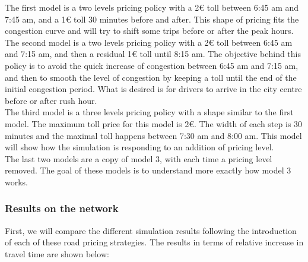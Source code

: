 \documentclass[a4paper, 12pt,oneside]{article}
\begin{document}
The first model is a two levels pricing policy with a 2€ toll between 6:45 am and 7:45 am, and a 1€ toll 30 minutes before and after. This shape of pricing fits the congestion curve and will try to shift some trips before or after the peak hours.\\

The second model is a two levels pricing policy with a 2€ toll between 6:45 am and 7:15 am, and then a residual 1€ toll until 8:15 am. The objective behind this policy is to avoid the quick increase of congestion between 6:45 am and 7:15 am, and then to smooth the level of congestion by keeping a toll until the end of the initial congestion period. What is desired is for drivers to arrive in the city centre before or after rush hour.\\

The third model is a three levels pricing policy with a shape similar to the first model. The maximum toll price for this model is 2€. The width of each step is 30 minutes and the maximal toll happens between 7:30 am and 8:00 am. This model will show how the simulation is responding to an addition of pricing level.\\

The last two models are a copy of model 3, with each time a pricing level removed. The goal of these models is to understand more exactly how model 3 works.

\subsubsection{Results on the network}

First, we will compare the different simulation results following the introduction of each of these road pricing strategies. The results in terms of relative increase in travel time are shown below:
\end{document}
